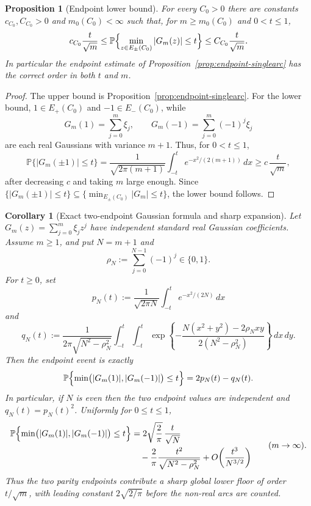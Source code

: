 \documentclass[11pt]{amsart}
\numberwithin{equation}{section}
\newtheorem{proposition}[theorem]{Proposition}
\newtheorem{corollary}[theorem]{Corollary}
\theoremstyle{definition}
\theoremstyle{remark}
\newcommand{\Prob}{\mathbb P}
\newcommand{\abs}[1]{\left\lvert #1\right\rvert}
\begin{document}
\begin{proposition}[Endpoint lower bound]\label{prop:endpoint-lower}
For every \(C_0>0\) there are constants \(c_{C_0},C_{C_0}>0\) and
\(m_0(C_0)<\infty\) such that, for \(m\ge m_0(C_0)\) and \(0<t\le1\),
\[
  c_{C_0}\frac{t}{\sqrt m}
  \le
  \Prob\Bigl\{\min_{z\in E_\pm(C_0)} |G_m(z)|\le t\Bigr\}
  \le
  C_{C_0}\frac{t}{\sqrt m}.
\]
In particular the endpoint estimate of Proposition~\ref{prop:endpoint-singlearc}
has the correct order in both \(t\) and \(m\).
\end{proposition}

\begin{proof}
The upper bound is Proposition~\ref{prop:endpoint-singlearc}.  For the lower
bound, \(1\in E_+(C_0)\) and \(-1\in E_-(C_0)\), while
\[
  G_m(1)=\sum_{j=0}^m\xi_j,\qquad
  G_m(-1)=\sum_{j=0}^m(-1)^j\xi_j
\]
are each real Gaussians with variance \(m+1\).  Thus, for \(0<t\le1\),
\[
  \Prob\{|G_m(\pm1)|\le t\}
  =
  \frac1{\sqrt{2\pi(m+1)}}\int_{-t}^{t}e^{-x^2/(2(m+1))}\,dx
  \ge c\,\frac{t}{\sqrt m},
\]
after decreasing \(c\) and taking \(m\) large enough. Since
\(\{\abs{G_m(\pm1)}\le t\}\subseteq
\{\min_{E_\pm(C_0)}\abs{G_m}\le t\}\), the lower bound follows.
\end{proof}

\begin{corollary}[Exact two-endpoint Gaussian formula and sharp expansion]\label{cor:endpoint-two-point}
Let \(G_m(z)=\sum_{j=0}^m\xi_jz^j\) have independent standard real Gaussian
coefficients. Assume \(m\ge1\), and put \(N=m+1\) and
\[
  \rho_N:=\sum_{j=0}^{N-1}(-1)^j\in\{0,1\}.
\]
For \(t\ge0\), set
\[
  p_N(t):=\frac1{\sqrt{2\pi N}}\int_{-t}^{t}e^{-x^2/(2N)}\,dx
\]
and
\[
  q_N(t):=
  \frac1{2\pi\sqrt{N^2-\rho_N^2}}
  \int_{-t}^{t}\int_{-t}^{t}
  \exp\!\left\{
    -\frac{N(x^2+y^2)-2\rho_Nxy}{2(N^2-\rho_N^2)}
  \right\}\,dx\,dy .
\]
Then the endpoint event is exactly
\begin{equation}\label{eq:endpoint-exact}
  \Prob\Bigl\{\min\bigl(|G_m(1)|,|G_m(-1)|\bigr)\le t\Bigr\}
  =2p_N(t)-q_N(t).
\end{equation}
In particular, if \(N\) is even then the two endpoint values are independent
and \(q_N(t)=p_N(t)^2\).  Uniformly for \(0\le t\le1\),
\[
  \begin{aligned}
  \Prob\Bigl\{\min\bigl(|G_m(1)|,|G_m(-1)|\bigr)\le t\Bigr\}
  &=
  2\sqrt{\frac2\pi}\,\frac{t}{\sqrt N}\\
  &\quad-\frac{2}{\pi}\frac{t^2}{\sqrt{N^2-\rho_N^2}}
  +O\!\left(\frac{t^3}{N^{3/2}}\right)
  \end{aligned}
  \qquad(m\to\infty).
\]
Thus the two parity endpoints contribute a sharp global lower floor of order
\(t/\sqrt m\), with leading constant \(2\sqrt{2/\pi}\) before the non-real arcs
are counted.
\end{corollary}
\end{document}
